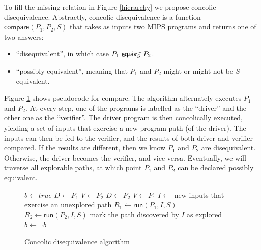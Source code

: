 \documentclass{llncs}
\newcommand{\merel}[1]{\textsf{equiv}_{#1}}
\newcommand{\pnmequiv}[3]{#1 \ \cancel{\merel{#3}} \ #2}
\begin{document}
To fill the missing relation in Figure \ref{hierarchy} we propose concolic disequivalence. Abstractly, concolic disequivalence is a function $\textsf{compare}(P_1, P_2, S)$ that takes as inputs two MIPS programs and returns one of two answers:
\begin{itemize}
\item ``disequivalent'', in which case $\pnmequiv{P_1}{P_2}{S}$.
\item ``possibly equivalent'', meaning that $P_1$ and $P_2$ might or might not be $S$-equivalent.
\end{itemize}

Figure \ref{concolicalgo} shows pseudocode for \textsf{compare}. The algorithm alternately executes $P_1$ and $P_2$. At every step, one of the programs is labelled as the ``driver'' and the other one as the ``verifier''. The driver program is then concolically executed, yielding a set of inputs that exercise a new program path (of the driver). The inputs can then be fed to the verifier, and the results of both driver and verifier compared. If the results are different, then we know $P_1$ and $P_2$ are disequivalent. Otherwise, the driver becomes the verifier, and vice-versa. Eventually, we will traverse all explorable paths, at which point $P_1$ and $P_2$ can be declared possibly equivalent.

\begin{figure}
\begin{algorithmic}
\State $b \gets true$
   
    \State $D \gets P_1$
    \State $V \gets P_2$
  \Else
    \State $D \gets P_2$
    \State $V \gets P_1$
  \EndIf
    \State $I \gets$ new inputs that exercise an unexplored path
    \State $R_1 \gets \textsf{run}(P_1, I, S)$
    \State $R_2 \gets \textsf{run}(P_2, I, S)$
      \State {}
        \State {}
      \Else
          \State {}
        \EndIf
      \EndIf
    \EndIf
    \State mark the path discovered by $I$ as explored
    \State $b \gets \neg b$
  \EndIf
\EndWhile
\State {}
\EndFunction
\end{algorithmic}
\label{concolicalgo}
\caption{Concolic disequivalence algorithm}
\end{figure}
\end{document}
